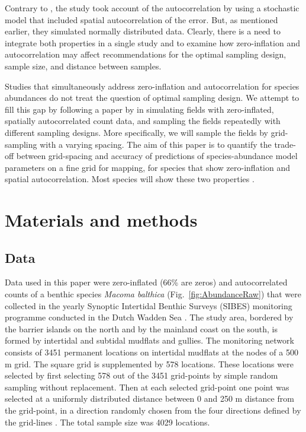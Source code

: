 \documentclass[review]{elsarticle}
\begin{document}
Contrary to \citet{tyre2003}, the \citet{bijleveld2012} study took account of the autocorrelation by using a stochastic model that included spatial autocorrelation of the error. But, as mentioned earlier, they simulated normally distributed data. Clearly, there is a need to integrate both properties in a single study and to examine how zero-inflation and autocorrelation may affect recommendations for the optimal sampling design, sample size, and distance between samples.

Studies that simultaneously address zero-inflation and autocorrelation for species abundances \citep[see e.g.][]{recta2012, boyd2015} do not treat the question of optimal sampling design.  We attempt to fill this gap by following a paper by \citet{lyashevska2016a} in simulating fields with zero-inflated, spatially autocorrelated count data, and sampling the fields repeatedly with different sampling designs. More specifically, we will sample the fields by grid-sampling with a varying spacing. The aim of this paper is to quantify the trade-off between grid-spacing and accuracy of predictions of species-abundance model parameters on a fine grid for mapping, for species that show zero-inflation and spatial autocorrelation. Most species will show these two properties \citep[see][and references therein]{martin2005}.

\section{Materials and methods} \label{sec:methods}

\subsection{Data}

Data used in this paper were zero-inflated (66\% are zeros) and autocorrelated counts of a benthic species \textit{Macoma balthica} (Fig.~\ref{fig:AbundanceRaw}) that were collected in the yearly Synoptic Intertidal Benthic Surveys (SIBES) monitoring programme conducted in the Dutch Wadden Sea \citep{bijleveld2012, compton2013}. The study area, bordered by the barrier islands on the north and by the mainland coast on the south, is formed by intertidal and subtidal mudflats and gullies. The monitoring network consists of 3451 permanent locations on intertidal mudflats at the nodes of a 500 m grid. The square grid is supplemented by 578 locations. These locations were selected by first selecting 578 out of the 3451 grid-points by simple random sampling without replacement. Then at each selected grid-point one point was selected at a uniformly distributed distance between 0 and 250 m distance from the grid-point, in a direction randomly chosen from the four directions defined by the grid-lines \citep{bijleveld2012}. The total sample size was 4029 locations.
\end{document}
